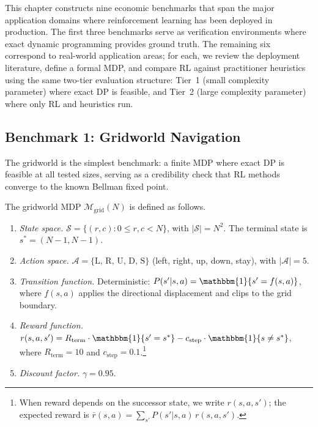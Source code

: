 
This chapter constructs nine economic benchmarks that span the major application domains where reinforcement learning has been deployed in production. The first three benchmarks serve as verification environments where exact dynamic programming provides ground truth. The remaining six correspond to real-world application areas; for each, we review the deployment literature, define a formal MDP, and compare RL against practitioner heuristics using the same two-tier evaluation structure: Tier~1 (small complexity parameter) where exact DP is feasible, and Tier~2 (large complexity parameter) where only RL and heuristics run.


\subsection{Benchmark 1: Gridworld Navigation}
\label{sec:benchmark_gridworld}

The gridworld is the simplest benchmark: a finite MDP where exact DP is feasible at all tested sizes, serving as a credibility check that RL methods converge to the known Bellman fixed point.

\begin{definition}
\label{def:gridworld_mdp}
The gridworld MDP $\mathcal{M}_{\mathrm{grid}}(N)$ is defined as follows.
\begin{enumerate}
    \item \emph{State space.} $\mathcal{S} = \{(r, c) : 0 \leq r, c < N\}$, with $|\mathcal{S}| = N^2$. The terminal state is $s^* = (N-1, N-1)$.
    \item \emph{Action space.} $\mathcal{A} = \{\text{L, R, U, D, S}\}$ (left, right, up, down, stay), with $|\mathcal{A}| = 5$.
    \item \emph{Transition function.} Deterministic: $P(s' | s, a) = \mathbbm{1}\{s' = f(s, a)\}$, where $f(s, a)$ applies the directional displacement and clips to the grid boundary.
    \item \emph{Reward function.} $r(s, a, s') = R_{\mathrm{term}} \cdot \mathbbm{1}\{s' = s^*\} - c_{\mathrm{step}} \cdot \mathbbm{1}\{s \neq s^*\}$, where $R_{\mathrm{term}} = 10$ and $c_{\mathrm{step}} = 0.1$.\footnote{When reward depends on the successor state, we write $r(s,a,s')$; the expected reward is $\bar{r}(s,a) = \sum_{s'} P(s'|s,a)\, r(s,a,s')$.}
    \item \emph{Discount factor.} $\gamma = 0.95$.
\end{enumerate}
\end{definition}

